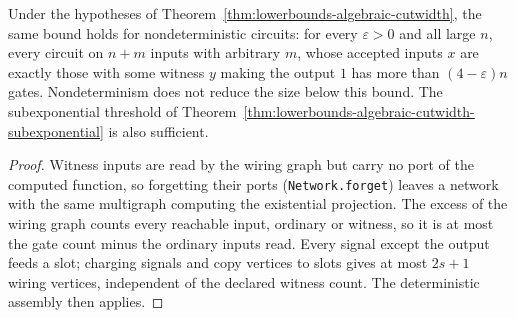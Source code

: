 \begin{theorem}
  \label{thm:lowerbounds-algebraic-cutwidth-nondet}
  \leanok
  Under the hypotheses of Theorem~\ref{thm:lowerbounds-algebraic-cutwidth},
  the same bound holds for nondeterministic circuits: for every
  $\varepsilon > 0$ and all large $n$, every circuit on $n + m$ inputs with
  arbitrary $m$, whose accepted inputs $x$ are exactly those with some witness $y$
  making the output $1$ has more than $(4 - \varepsilon)n$ gates.
  Nondeterminism does not reduce the size below this bound. The subexponential
  threshold of Theorem~\ref{thm:lowerbounds-algebraic-cutwidth-subexponential}
  is also sufficient.
\end{theorem}
\begin{proof}
  \leanok
  Witness inputs are read by the wiring graph but carry no port of the
  computed function, so forgetting their ports (\texttt{Network.forget})
  leaves a network with the same multigraph computing the existential
  projection. The excess of the wiring graph counts every reachable input,
  ordinary or witness, so it is at most the gate count minus the ordinary
  inputs read. Every signal except the output feeds a slot; charging signals
  and copy vertices to slots gives at most $2s+1$ wiring vertices, independent
  of the declared witness count. The deterministic assembly then applies.
\end{proof}

